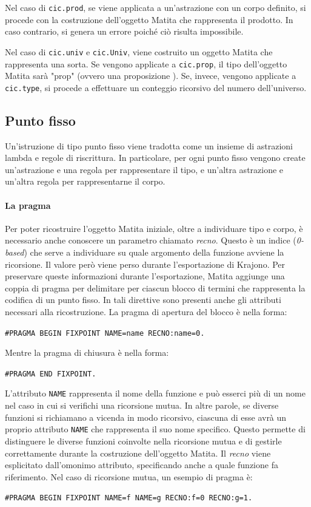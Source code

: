 \documentclass[12pt,a4paper]{mimosis}
\begin{document}
Nel caso di \texttt{cic.prod}, se viene applicata a un'astrazione con un corpo definito,
si procede con la costruzione dell'oggetto Matita che rappresenta il prodotto. In caso
contrario, si genera un errore poiché ciò risulta impossibile.

Nel caso di \texttt{cic.univ} e \texttt{cic.Univ}, viene costruito un
oggetto Matita che rappresenta una sorta. Se vengono applicate a 
\texttt{cic.prop}, il tipo dell'oggetto Matita sarà "prop" (ovvero una proposizione
). Se, invece, vengono applicate a \texttt{cic.type},
si procede a effettuare un conteggio ricorsivo del numero dell'universo.

\subsection{Punto fisso} 
Un'istruzione di tipo punto fisso viene tradotta come un insieme di astrazioni 
lambda e regole di riscrittura. In particolare, per ogni punto fisso vengono 
create un'astrazione e una regola per rappresentare il tipo, e un'altra astrazione
e un'altra regola per rappresentarne il corpo.


\paragraph{La pragma} Per poter ricostruire l'oggetto Matita iniziale, oltre
a individuare tipo e corpo, è necessario anche conoscere un parametro chiamato
\textit{recno}. Questo è un indice (\textit{0-based}) che serve a individuare
su quale argomento della funzione avviene la ricorsione. Il valore però viene
perso durante l'esportazione di Krajono.
Per preservare queste informazioni durante l'esportazione, Matita aggiunge 
una coppia di pragma per delimitare per ciascun blocco di termini che rappresenta 
la codifica di un punto fisso. In tali direttive sono presenti anche gli attributi
necessari alla ricostruzione. La pragma di apertura del blocco è nella forma:
\begin{center}
\texttt{\#PRAGMA BEGIN FIXPOINT NAME=name RECNO:name=0.}
\end{center}
Mentre la pragma di chiusura è nella forma:
\begin{center}
\texttt{\#PRAGMA END FIXPOINT.}
\end{center}

L'attributo \texttt{NAME} rappresenta il nome della funzione e può esserci più
di un nome nel caso in cui si verifichi una ricorsione mutua. In altre parole,
se diverse funzioni si richiamano a vicenda in modo ricorsivo, ciascuna di esse
avrà un proprio attributo \texttt{NAME} che rappresenta il suo nome specifico.
Questo permette di distinguere le diverse funzioni coinvolte nella ricorsione 
mutua e di gestirle correttamente durante la costruzione dell'oggetto Matita.
Il \textit{recno} viene esplicitato dall'omonimo attributo, specificando anche
a quale funzione fa riferimento. Nel caso di ricorsione mutua, un esempio di
pragma è:
\begin{center}
\texttt{\#PRAGMA BEGIN FIXPOINT NAME=f NAME=g RECNO:f=0 RECNO:g=1.}
\end{center}
\end{document}
